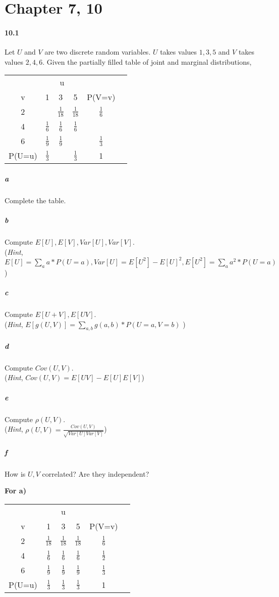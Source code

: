 \documentclass[11pt]{article} %
\begin{document}
\section{Chapter 7, 10}

\paragraph*{10.1} Let $U$ and $V$ are two discrete random variables. $U$ takes values $1, 3, 5$ and $V$ takes values $2, 4, 6$. Given the partially filled table of joint and marginal distributions, 
\begin{table}[h!]
\centering
\renewcommand{\arraystretch}{1.5}
\begin{tabular}{cccccc}
\hline \hline 
 &  \multicolumn{3}{c}{u} \\ \cline{2-4} 
v & 1 & 3 & 5 & P(V=v) \\ \hline
2 & & $\frac{1}{18}$ & $\frac{1}{18}$ & $\frac{1}{6}$ \\ 
4 & $\frac{1}{6}$ & $\frac{1}{6}$ & $\frac{1}{6}$ &  \\  
6 & $\frac{1}{9}$ & $\frac{1}{9}$ & & $\frac{1}{3}$ \\ \hline
P(U=u) & $\frac{1}{3}$ &  & $\frac{1}{3}$ & 1 \\ \hline \hline
\end{tabular}
\end{table}
\subparagraph*{a} Complete the table. 
\subparagraph*{b} Compute $E[U], E[V], Var[U], Var[V]$. \\(\textit{Hint}, $E[U] = \sum_a a*P(U=a), Var[U]=E[U^2] - E[U]^2, E[U^2]=\sum_a a^2*P(U=a)$)
\subparagraph*{c} Compute $E[U + V], E[UV]$. \\(\textit{Hint}, $E[g(U, V)] = \sum_{a,b}g(a,b) *P(U=a, V=b)$ )
\subparagraph*{d} Compute $Cov(U, V)$. \\(\textit{Hint}, $Cov(U,V) = E[UV] - E[U]E[V]$)
\subparagraph*{e} Compute $\rho(U, V)$. \\(\textit{Hint}, $\rho(U, V) = \frac{Cov(U,V)}{\sqrt{Var[U]Var[V]}}$)
\subparagraph*{f} How is $U,V$ correlated? Are they independent? 

{\bf For a)}\\
\begin{table}[h!]
\centering
\renewcommand{\arraystretch}{1.5}
\begin{tabular}{cccccc}
\hline \hline 
 &  \multicolumn{3}{c}{u} \\ \cline{2-4} 
v & 1 & 3 & 5 & P(V=v) \\ \hline
2 & $\frac{1}{18}$ & $\frac{1}{18}$ & $\frac{1}{18}$ & $\frac{1}{6}$ \\ 
4 & $\frac{1}{6}$ & $\frac{1}{6}$ & $\frac{1}{6}$ & $\frac{1}{2}$ \\  
6 & $\frac{1}{9}$ & $\frac{1}{9}$ & $\frac{1}{9}$ & $\frac{1}{3}$ \\ \hline
P(U=u) & $\frac{1}{3}$ & $\frac{1}{3}$ & $\frac{1}{3}$ & 1 \\ \hline \hline
\end{tabular}
\end{table}
\end{document}

